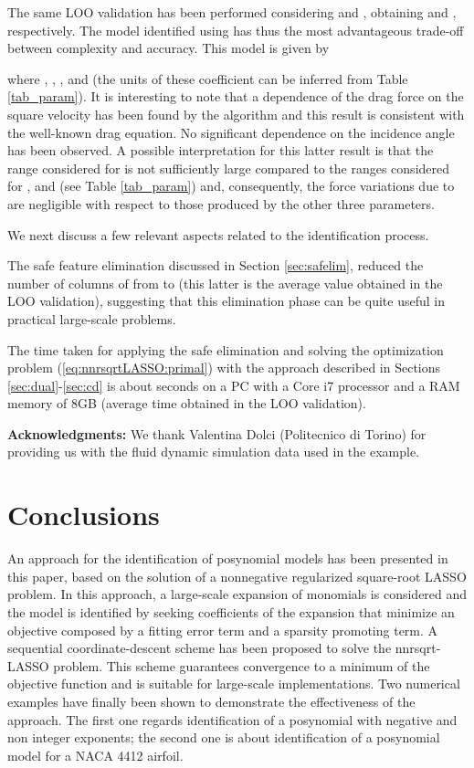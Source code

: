 \documentclass[11pt]{article}
\begin{document}
The same LOO validation has been performed considering 
and , obtaining  and , respectively.
The model identified using  has thus the most advantageous
trade-off between complexity and accuracy. This model is given by

where , ,
, and 
(the units of these coefficient can be inferred from Table \ref{tab_param}).
It is interesting to note that a dependence of the drag force on the
square velocity has been found by the algorithm and this result is
consistent with the well-known drag equation. No significant dependence
on the incidence angle  has been observed. A possible interpretation
for this latter result is that the range considered for 
is not sufficiently large compared to the ranges considered for ,
 and  (see Table \ref{tab_param}) and, consequently, the
force variations due to  are negligible with respect to those
produced by the other three parameters.

We next discuss a few relevant aspects related to the identification
process.

The safe feature elimination discussed in Section \ref{sec:safelim},
reduced the number of columns of  from  to  (this
latter is the average value obtained in the LOO validation), suggesting
that this elimination phase can be quite useful in practical large-scale
problems.

The time taken for applying the safe elimination and solving the optimization
problem (\ref{eq:nnrsqrtLASSO:primal}) with the approach described
in Sections \ref{sec:dual}-\ref{sec:cd} is about  seconds
on a PC with a Core i7 processor and a RAM memory of 8GB (average
time obtained in the LOO validation).

{\bf Acknowledgments:}
We thank Valentina Dolci (Politecnico di Torino) for providing us
with the fluid dynamic simulation data used in the example.

\section{Conclusions}

An approach for the identification of posynomial models has been presented in this paper, based on the solution of a nonnegative regularized square-root LASSO  problem. In this approach, a large-scale expansion of monomials is considered and the model is identified by seeking coefficients of the expansion that minimize an objective composed by a fitting error term and a sparsity promoting term. A sequential coordinate-descent scheme has been proposed to solve the nnrsqrt-LASSO problem. This scheme guarantees convergence to a minimum of the objective function and is suitable for large-scale implementations. Two numerical examples have finally been shown to demonstrate the effectiveness of the approach. The first one regards identification of a posynomial with negative and non integer exponents; the second one is about identification of a posynomial model for a NACA 4412 airfoil.



\end{document}
